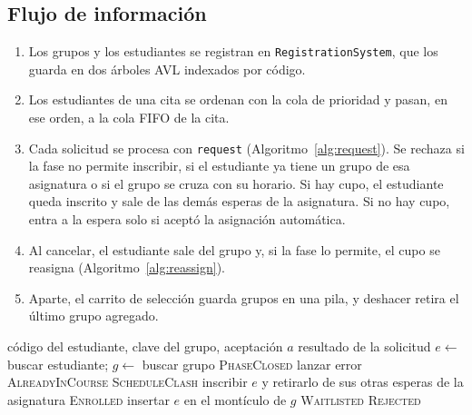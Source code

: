 \documentclass[conference]{IEEEtran}
\begin{document}
\subsection{Flujo de información}
\begin{enumerate}
    \item Los grupos y los estudiantes se registran en \texttt{RegistrationSystem}, que los guarda en dos árboles AVL indexados por código.
    \item Los estudiantes de una cita se ordenan con la cola de prioridad y pasan, en ese orden, a la cola FIFO de la cita.
    \item Cada solicitud se procesa con \texttt{request} (Algoritmo~\ref{alg:request}). Se rechaza si la fase no permite inscribir, si el estudiante ya tiene un grupo de esa asignatura o si el grupo se cruza con su horario. Si hay cupo, el estudiante queda inscrito y sale de las demás esperas de la asignatura. Si no hay cupo, entra a la espera solo si aceptó la asignación automática.
    \item Al cancelar, el estudiante sale del grupo y, si la fase lo permite, el cupo se reasigna (Algoritmo~\ref{alg:reassign}).
    \item Aparte, el carrito de selección guarda grupos en una pila, y deshacer retira el último grupo agregado.
\end{enumerate}

\begin{algorithm}[htbp]
\caption{Solicitar un grupo (\texttt{RegistrationSystem.request})}
\label{alg:request}
\begin{algorithmic}[1]
\Require código del estudiante, clave del grupo, aceptación $a$
\Ensure resultado de la solicitud
\State $e \gets$ buscar estudiante; $g \gets$ buscar grupo 
 \Return \textsc{PhaseClosed} \EndIf
{} lanzar error \EndIf {}
 \Return \textsc{AlreadyInCourse} \EndIf {}
 \Return \textsc{ScheduleClash} \EndIf {}
    \State inscribir $e$ y retirarlo de sus otras esperas de la asignatura
    \State \Return \textsc{Enrolled}
    \State insertar $e$ en el montículo de $g$ 
    \State \Return \textsc{Waitlisted}
\Else
    \State \Return \textsc{Rejected}
\EndIf
\end{algorithmic}
\end{algorithm}
\end{document}
